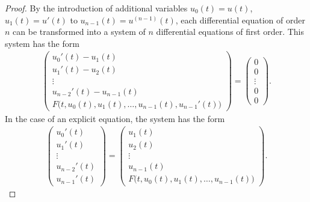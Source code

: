 \begin{proof}
  By the introduction of additional variables $u_0(t) = u(t)$, $u_1(t)
  = u'(t)$ to $u_{n-1}(t) = u^{(n-1)}(t)$, each differential equation of
  order $n$ can be transformed into a system of $n$ differential equations
  of first order. This system has the form
  \begin{gather}
    \label{eq:IVP:13}
    \begin{pmatrix}
      u_0'(t) - u_1(t) \\
      u_1'(t) - u_2(t) \\
      \vdots\\
      u_{n-2}'(t) - u_{n-1}(t) \\
      F\bigl(t, u_0(t),u_1(t),\dots,u_{n-1}(t), u_{n-1}'(t)\bigr)
    \end{pmatrix}
    =
    \begin{pmatrix}
      0\\0\\\vdots\\0\\0
    \end{pmatrix}.
  \end{gather}
  In the case of an explicit equation, the system has the form
  \begin{gather}
    \label{eq:IVP:13a}
    \begin{pmatrix}
      u_0'(t) \\
      u_1'(t) \\
      \vdots\\
      u_{n-2}'(t) \\
      u_{n-1}' (t)
    \end{pmatrix}
    =
    \begin{pmatrix}
      u_1(t)\\u_2(t)\\\vdots\\u_{n-1}(t)\\F\bigl(t, u_0(t),u_1(t),\dots,u_{n-1}(t)\bigr)
    \end{pmatrix}.
  \end{gather}
\end{proof}

